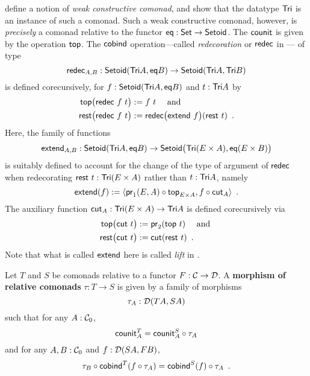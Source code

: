 \documentclass{amsart}
\newcommand{\fat}[1]{\textbf{#1}}
\begin{document}
\begin{example}
\noindent
\textcite{DBLP:conf/types/MatthesP11} define a notion of \emph{weak constructive comonad}, and show that the datatype $\Tri$
  is an instance of such a comonad. 
  Such a weak constructive comonad, however, is \emph{precisely}
  a comonad relative to the functor $\eq : \Set\to\Setoid$.
  The $\counit$ is given by the operation $\head$.
  The $\cobind$ operation---called \emph{redecoration} or $\redec$ in \parencite{DBLP:conf/types/MatthesP11}--- of type
   \[ \redec_{A,B} : \Setoid(\Tri A,\eq B) \to \Setoid(\Tri A,\Tri B )\] is defined 
  corecursively, for $f:\Setoid(\Tri A,\eq B)$  and $t : \Tri A$ by
      \begin{align*}\head\bigl(\redec~f~t\bigr) &:= f~t \quad\text{ and } \\
                     \tail\bigl(\redec~f~t\bigr) &:= \redec\bigl(\extend~f\bigr)(\tail~t) \enspace . 
      \end{align*}
Here, the family of functions 
     \[\extend_{A,B} : \Setoid(\Tri A,\eq B) \to \Setoid\bigr(\Tri (E \times A),\eq(E\times B)\bigr)\]
  is suitably defined to account for the change of the type of argument of $\redec$ when redecorating $\tail~t : \Tri(E\times A)$
  rather than $t : \Tri A$, namely
  \[ \extend(f) := \langle \comp{\head_{E\times A}}{\pr_1(E,A)} , \comp{\cut_A}{f} \rangle \enspace . \]
  The auxiliary function $\cut_A : \Tri(E\times A) \to \Tri A$ is defined corecursively via
   \begin{align*}\head\bigl(\cut~t\bigr) &:= \pr_2(\head~t) \quad\text{ and } \\
                     \tail\bigl(\cut~t\bigr) &:= \cut(\tail~t) \enspace . 
      \end{align*}
 Note that what is called $\extend$ here is called \textit{lift} in \parencite{DBLP:conf/types/MatthesP11}.
  
  
  
\end{example}






\begin{definition}\label{def:comonad_morphism}
 Let $T$ and $S$ be comonads relative to a functor $F : \C \to \D$. A \fat{morphism of relative comonads} $\tau : T \to S$
  is given by a family of morphisms \[\tau_A : \D(TA,SA)\] such that for any $A : \C_0$,
     \[  \counit^T_A = \comp{\tau_A}{\counit^S_A} \]
   and for any $A,B : \C_0$ and $f : \D(SA,FB)$,
   \[  \comp{\cobind^T(\comp{\tau_A}{f})}{\tau_B} = \comp{\tau_A}{\cobind^S(f)} \enspace .  \]
\end{definition}
\end{document}
